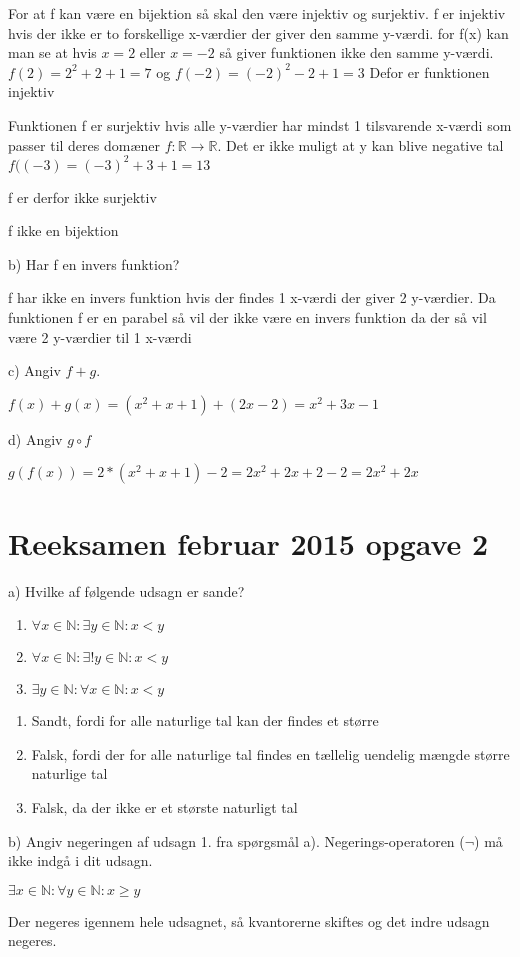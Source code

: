 \documentclass{article}
\begin{document}
For at f kan være en bijektion så skal den være injektiv og surjektiv. f er injektiv hvis der ikke er to forskellige x-værdier der giver den samme y-værdi. for f(x) kan man se at hvis $x=2$ eller $x=-2$ så giver funktionen ikke den samme y-værdi. 
\(f(2)=2^2+2+1=7\) og \(f(-2)=(-2)^2-2+1=3\)
Defor er funktionen injektiv

Funktionen f er surjektiv hvis alle y-værdier har mindst 1 tilsvarende x-værdi som passer til deres domæner \(f : \mathbb{R} \rightarrow \mathbb{R}\). 
Det er ikke muligt at y kan blive negative tal
\(f((-3)=(-3)^2+3+1=13\)

f er derfor ikke surjektiv

f ikke en bijektion

b) Har f en invers funktion?

f har ikke en invers funktion hvis der findes 1 x-værdi der giver 2 y-værdier.
Da funktionen f er en parabel så vil der ikke være en invers funktion da der så vil være 2 y-værdier til 1 x-værdi

c) Angiv \(f + g\).

\(f(x)+g(x)=(x^2+x+1)+(2x-2)=x^2+3x-1\)

d) Angiv \(g \circ f\) 

\(g(f(x))=2*(x^2+x+1)-2=2x^2+2x+2-2=2x^2+2x\)

\section{Reeksamen februar 2015 opgave 2}
a) Hvilke af følgende udsagn er sande?

\begin{enumerate}
    \item $\forall x \in\mathbb{N}: \exists y \in\mathbb{N}: x < y$
    \item $\forall x \in\mathbb{N}: \exists!y \in\mathbb{N}: x < y$
    \item $\exists y \in\mathbb{N}: \forall x \in\mathbb{N}: x < y$
\end{enumerate}

\begin{enumerate}
    \item Sandt, fordi for alle naturlige tal kan der findes et større
    \item Falsk, fordi der for alle naturlige tal findes en tællelig uendelig mængde større naturlige tal
    \item Falsk, da der ikke er et største naturligt tal
\end{enumerate}

\noindent b) Angiv negeringen af udsagn 1. fra spørgsmål a). Negerings-operatoren ($\neg$) må ikke indgå i dit udsagn.

$\exists x \in\mathbb{N}: \forall y \in\mathbb{N}: x \geq y$

\noindent Der negeres igennem hele udsagnet, så kvantorerne skiftes og det indre udsagn negeres.
\end{document}
